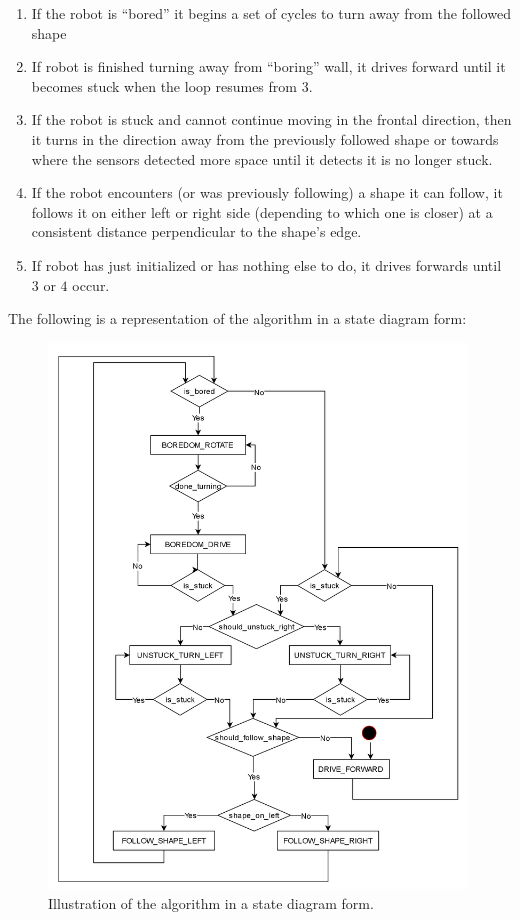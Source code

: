 \documentclass[11pt, a4paper]{article}
\begin{document}
\begin{enumerate}
  \item If the robot is ``bored'' it begins a set of cycles to turn away from the followed shape 

  \item If robot is finished turning away from ``boring'' wall, it drives forward until it becomes stuck when the loop resumes from ${3.}$

  \item If the robot is stuck and cannot continue moving in the frontal direction, then it turns in the direction away from the previously followed shape or towards where the sensors detected more space until it detects it is no longer stuck. 

  \item If the robot encounters (or was previously following) a shape it can follow, it follows it on either left or right side (depending to which one is closer) at a consistent distance perpendicular to the shape's edge.
  
  \item If robot has just initialized or has nothing else to do, it drives forwards until $3$ or $4$ occur. 
\end{enumerate}

The following is a representation of the algorithm in a state diagram form:
\begin{figure}[h]
  \begin{center}
    \includegraphics[width=30em]{../assets/state-diagram.png}
    \caption{Illustration of the algorithm in a state diagram form.}
  \end{center}
\end{figure}
\end{document}
